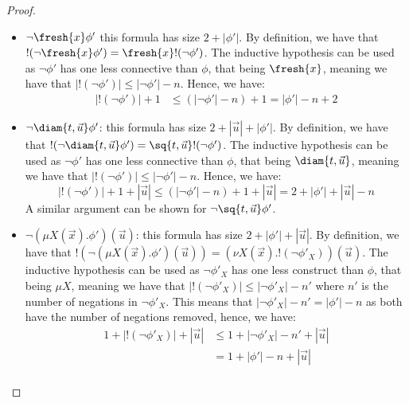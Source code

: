\begin{proof}
\begin{itemize}
		By definition, we have that $!(\lnot \bigvee\nolimits_x \phi') = \bigwedge\nolimits_x !(\lnot \phi')$. 
		The inductive hypothesis can be used as $\lnot \phi'$ has one less connective than $\phi$, that being $\bigvee\nolimits_x$, meaning
		we have that $|!(\lnot \phi')| \le |\lnot \phi'| - n$.
		Hence, we have:
		\begin{align*}
			|!(\lnot \phi')| + 1 &\le (|\lnot \phi'| - n) + 1= |\phi'| - n + 2
		\end{align*}    
		A similar argument can be shown for $\lnot\bigwedge\nolimits_x \phi'$.
		        \item $\lnot \fresh{x}\phi'$ this formula has size $2 + |\phi'|$. 
		By definition, we have that $!(\lnot \fresh{x} \phi') = \fresh{x}!(\lnot \phi')$. 
		The inductive hypothesis can be used as $\lnot \phi'$ has one less connective than $\phi$, that being $\fresh{x}$, meaning
		we have that $|!(\lnot \phi')| \le |\lnot \phi'| - n$.
		Hence, we have:
		\begin{align*}
			|!(\lnot \phi')| + 1 &\le (|\lnot \phi'| - n) + 1= |\phi'| - n + 2
		\end{align*}
				\item $\lnot \diam{t, \vec u} \phi'$: 
		this formula has size $2 + |\vec u| + |\phi'|$. 
		By definition, we have that $!(\lnot\diam{t, \vec u}\phi') = \sq{t, \vec u}!(\lnot \phi')$.
		The inductive hypothesis can be used as $\lnot \phi'$ has one less connective than $\phi$, that being $\diam{t, \vec u}$, meaning we have that $|!(\lnot \phi')| \le |\lnot \phi'| - n$. 
		Hence, we have:
		\[
		|!(\lnot \phi')| + 1 + |\vec u| \le (|\lnot \phi'| - n) + 1 + |\vec u| = 2 + |\phi'| + |\vec u| - n 
		\]
		A similar argument can be shown for $\lnot\sq{t, \vec u}\phi'$.
				\item $\lnot (\mu X(\vec x).\phi')(\vec u)$: this formula has size $2 + |\phi'| + |\vec u|$. 
		By definition, we have that $!(\lnot (\mu X(\vec x).\phi')(\vec u)) = (\nu X(\vec x).!(\lnot \phi'_X))(\vec u)$.
		The inductive hypothesis can be used as $\lnot \phi'_X$ has one less construct than $\phi$, that being $\mu X$, meaning
		we have that $|!(\lnot\phi'_X)| \leq |\lnot \phi'_X| - n'$ where $n'$ is the number of negations in $\lnot \phi'_X$.
		This means that $|\lnot \phi'_X| - n' = |\phi'| - n$ as both have the number of negations removed,
		hence, we have:
		\begin{align*}
			1 + |!(\lnot \phi'_X)| + |\vec u| &\le 1 + |\lnot \phi'_X| - n' + |\vec u| \\
			&= 1 + |\phi'| - n + |\vec u|\\

\end{align*}
\end{itemize}
\end{proof}
